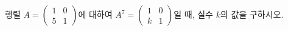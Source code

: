행렬 $A=\begin{pmatrix} 1 & 0 \\ 5 & 1 \end{pmatrix}$에 대하여 $A^7=\begin{pmatrix} 1 & 0 \\ k & 1 \end{pmatrix}$일 때, 실수 $k$의 값을 구하시오.
